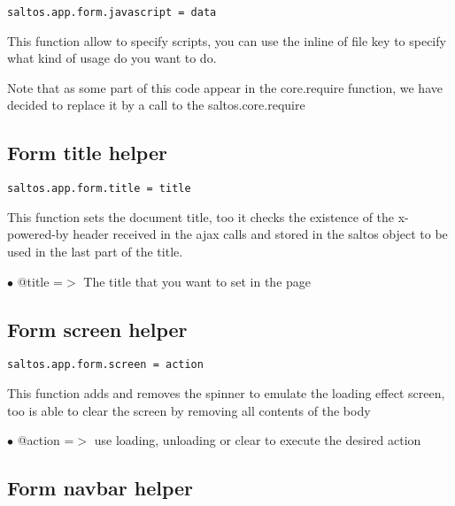 \documentclass[a4paper]{book}
\begin{document}
\begin{lstlisting}
saltos.app.form.javascript = data
\end{lstlisting}

This function allow to specify scripts, you can use the inline of file key to specify
what kind of usage do you want to do.

Note that as some part of this code appear in the core.require function, we have decided
to replace it by a call to the saltos.core.require

\hypertarget{toc384}{}
\subsection{Form title helper}

\begin{lstlisting}
saltos.app.form.title = title
\end{lstlisting}

This function sets the document title, too it checks the existence of the x-powered-by
header received in the ajax calls and stored in the saltos object to be used in the
last part of the title.

\begin{compactitem}
\item[\color{myblue}$\bullet$] @title =$>$ The title that you want to set in the page
\end{compactitem}

\hypertarget{toc385}{}
\subsection{Form screen helper}

\begin{lstlisting}
saltos.app.form.screen = action
\end{lstlisting}

This function adds and removes the spinner to emulate the loading effect screen, too is able
to clear the screen by removing all contents of the body

\begin{compactitem}
\item[\color{myblue}$\bullet$] @action =$>$ use loading, unloading or clear to execute the desired action
\end{compactitem}

\hypertarget{toc386}{}
\subsection{Form navbar helper}
\end{document}
